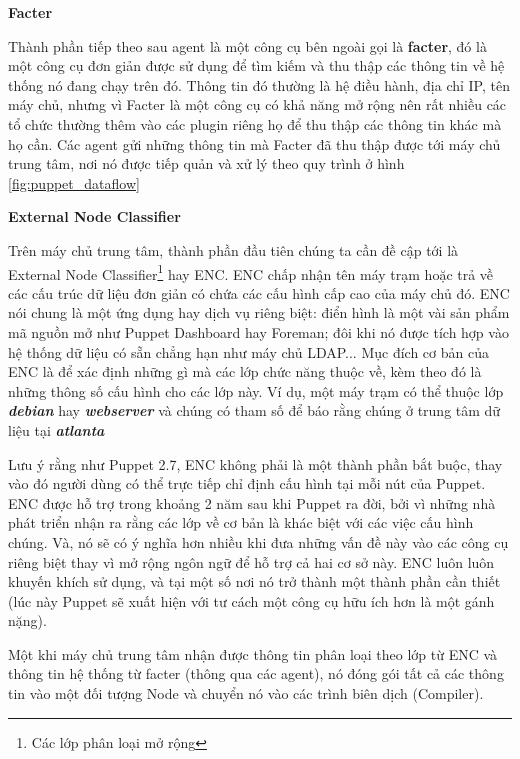 \textbf{\large Facter}


Thành phần tiếp theo sau agent là một công cụ bên ngoài gọi là \textbf{\textbf{facter}}, đó là một công cụ đơn giản được sử dụng để tìm kiếm và thu thập các thông tin về hệ thống nó đang chạy trên đó. Thông tin đó thường là hệ điều hành, địa chỉ IP, tên máy chủ, nhưng vì Facter là một công cụ có khả năng mở rộng nên rất nhiều các tổ chức thường thêm vào các plugin riêng họ để thu thập các thông tin khác mà họ cần. Các agent gửi những thông tin mà Facter đã thu thập được tới máy chủ trung tâm, nơi nó được tiếp quản và xử lý theo quy trình ở hình \ref{fig:puppet_dataflow}


\textbf{\large External Node Classifier}


Trên máy chủ trung tâm, thành phần đầu tiên chúng ta cần đề cập tới là External Node Classifier\footnote{Các lớp phân loại mở rộng} hay ENC. ENC chấp nhận tên máy trạm hoặc trả về các cấu trúc dữ liệu đơn giản có chứa các cấu hình cấp cao của máy chủ đó. ENC nói chung là một ứng dụng hay dịch vụ riêng biệt: điển hình là một vài sản phẩm mã nguồn mở như Puppet Dashboard hay Foreman; đôi khi nó được tích hợp vào hệ thống dữ liệu có sẵn chẳng hạn như máy chủ LDAP... Mục đích cơ bản của ENC là để xác định những gì mà các lớp chức năng thuộc về, kèm theo đó là những thông số cấu hình cho các lớp này. Ví dụ, một máy trạm có thể thuộc lớp \textbf{\textit{debian}} hay \textbf{\textit{webserver}} và chúng có tham số để báo rằng chúng ở trung tâm dữ liệu tại \textbf{\textit{atlanta}}

Lưu ý rằng như Puppet 2.7, ENC không phải là một thành phần bắt buộc, thay vào đó người dùng có thể trực tiếp chỉ định cấu hình tại mỗi nút của Puppet. ENC được hỗ trợ trong khoảng 2 năm sau khi Puppet ra đời, bởi vì những nhà phát triển nhận ra rằng các lớp về cơ bản là khác biệt với các việc cấu hình chúng. Và, nó sẽ có ý nghĩa hơn nhiều khi đưa những vấn đề này vào các công cụ riêng biệt thay vì mở rộng ngôn ngữ để hỗ trợ cả hai cơ sở này. ENC luôn luôn khuyến khích sử dụng, và tại một số nơi nó trở thành một thành phần cần thiết (lúc này Puppet sẽ xuất hiện với tư cách một công cụ hữu ích hơn là một gánh nặng).

Một khi máy chủ trung tâm nhận được thông tin phân loại theo lớp từ ENC và thông tin hệ thống từ facter (thông qua các agent), nó đóng gói tất cả các thông tin vào một đối tượng Node và chuyển nó vào các trình biên dịch (Compiler).


